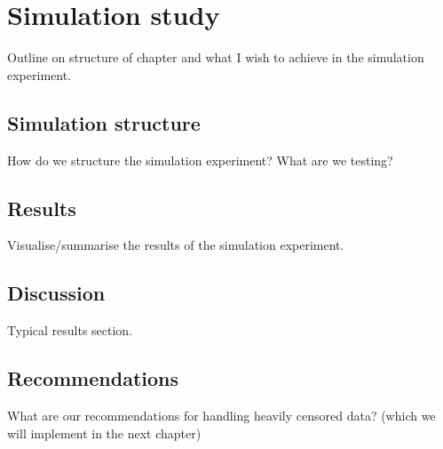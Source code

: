 \chapter{Simulation study}\label{chap:chapter3}

Outline on structure of chapter and what I wish to achieve in the simulation experiment.

\section{Simulation structure}

How do we structure the simulation experiment? What are we testing?

\section{Results}

Visualise/summarise the results of the simulation experiment.

\section{Discussion}

Typical results section.

\section{Recommendations}

What are our recommendations for handling heavily censored data? (which we will implement in the next chapter)